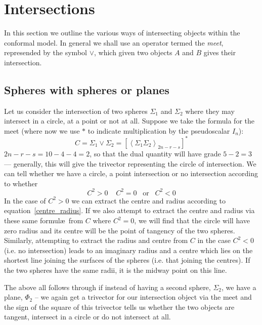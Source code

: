 \section{Intersections}

In this section we outline the various ways of intersecting
objects within the conformal model. In general we shall
use an operator termed the \emph{meet}, represended
by the symbol $\vee$, which given two objects $A$ and $B$
gives their intersection.

\subsection{Spheres with spheres or planes}

Let us consider the intersection of two spheres $\Sigma_1$ and
$\Sigma_2$ where they may intersect in a circle, at a point or not
at all. Suppose we take the formula for the meet\cite{GA:llw} (where now we use
$*$ to indicate multiplication by the pseudoscalar $I_n$):
%
\begin{equation}
C = \Sigma_1 \vee \Sigma_2 = \left[\left< \Sigma_1 \Sigma_2
\right>_{2n-r-s}\right]^*
\end{equation}
%
$2n-r-s = 10-4-4=2$, so that the dual quantity will have
grade $5-2=3$ --- generally, this will give the trivector
representing the circle of intersection. We can tell
whether we have a circle, a point intersection or no
intersection according to whether
%
\begin{equation}
C^2 >0 \;\;\;\; C^2 = 0 \;\;\;\mbox{or}\;\;\; C^2<0
\end{equation}
%
In the case of $C^2>0$ we can extract the centre and radius
according to equation~\ref{centre_radius}. If we also attempt to
extract the centre and radius via these same formul\ae\ from $C$
where $C^2=0$, we will find that the circle will have zero radius
and its centre will be the point of tangency of the two spheres.
Similarly, attempting to extract the radius and centre from $C$ in
the case $C^2<0$ (i.e. no intersection) leads to an imaginary
radius and a centre which lies on the shortest line joining the
surfaces of the spheres (i.e. that joining the centres). If the
two spheres have the same radii, it is the midway point on this
line.

The above all follows through if instead of having a
second sphere, $\Sigma_2$, we have a plane, $\Phi_2$ -- we again get a
trivector for our intersection object via the meet and the sign of the square
of this trivector tells us whether the two objects are tangent, intersect in a
circle or do not intersect at all.

